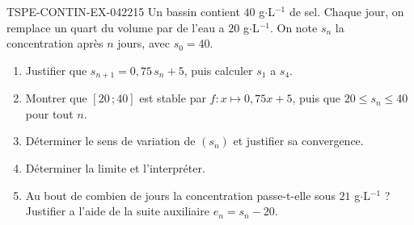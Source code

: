 \begin{exercice}{TSPE-CONTIN-EX-042}{2}{15}
Un bassin contient $40$ g$\cdot$L$^{-1}$ de sel. Chaque jour, on remplace un quart du volume par de l'eau a $20$ g$\cdot$L$^{-1}$. On note $s_n$ la concentration après $n$ jours, avec $s_0 = 40$.
\begin{enumerate}
  \item Justifier que $s_{n+1} = 0{,}75\,s_n + 5$, puis calculer $s_1$ a $s_4$.
  \item Montrer que $[20\,;40]$ est stable par $f : x \mapsto 0{,}75x + 5$, puis que $20 \leq s_n \leq 40$ pour tout $n$.
  \item Déterminer le sens de variation de $(s_n)$ et justifier sa convergence.
  \item Déterminer la limite et l'interpréter.
  \item Au bout de combien de jours la concentration passe-t-elle sous $21$ g$\cdot$L$^{-1}$ ? Justifier a l'aide de la suite auxiliaire $e_n = s_n - 20$.
\end{enumerate}
\end{exercice}
